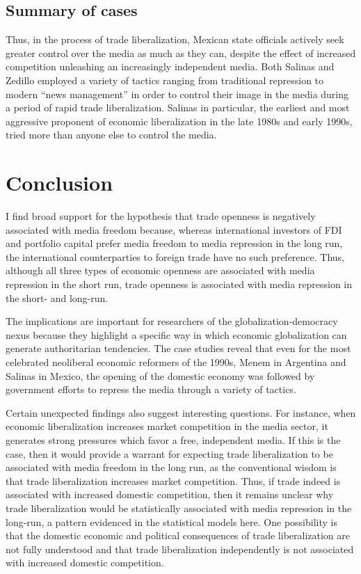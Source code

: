 \documentclass[12pt]{report}
\begin{document}
\subsection{Summary of cases}

Thus, in the process of trade liberalization, Mexican state officials
actively seek greater control over the media as much as they can,
despite the effect of increased competition unleashing an increasingly
independent media. Both Salinas and Zedillo employed a variety of
tactics ranging from traditional repression to modern ``news management''
in order to control their image in the media during a period of rapid
trade liberalization. Salinas in particular, the earliest and most
aggressive proponent of economic liberalization in the late 1980s
and early 1990s, tried more than anyone else to control the media.


\section{Conclusion}

I find broad support for the hypothesis that trade openness is negatively
associated with media freedom because, whereas international investors
of FDI and portfolio capital prefer media freedom to media repression
in the long run, the international counterparties to foreign trade
have no such preference. Thus, although all three types of economic
openness are associated with media repression in the short run, trade
openness is associated with media repression in the short- and long-run.

The implications are important for researchers of the globalization-democracy
nexus because they highlight a specific way in which economic globalization
can generate authoritarian tendencies. The case studies reveal that
even for the most celebrated neoliberal economic reformers of the
1990s, Menem in Argentina and Salinas in Mexico, the opening of the
domestic economy was followed by government efforts to repress the
media through a variety of tactics. 

Certain unexpected findings also suggest interesting questions. For
instance, when economic liberalization increases market competition
in the media sector, it generates strong pressures which favor a free,
independent media. If this is the case, then it would provide a warrant
for expecting trade liberalization to be associated with media freedom
in the long run, as the conventional wisdom is that trade liberalization
increases market competition. Thus, if trade indeed is associated
with increased domestic competition, then it remains unclear why trade
liberalization would be statistically associated with media repression
in the long-run, a pattern evidenced in the statistical models here.
One possibility is that the domestic economic and political consequences
of trade liberalization are not fully understood and that trade liberalization
independently is not associated with increased domestic competition.
\end{document}
